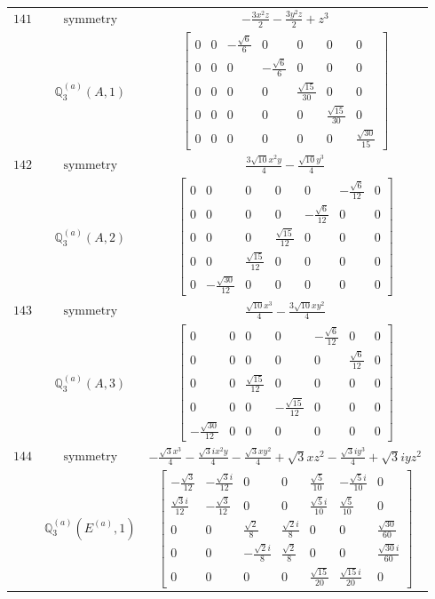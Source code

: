 \documentclass[fleqn,8pt,landscape]{jsarticle}
\begin{document}
\begin{longtable}{ccc}
$ 141 $ & $ \text{symmetry} $ & $ - \frac{3 x^{2} z}{2} - \frac{3 y^{2} z}{2} + z^{3} $ \\
$  $ & $ \mathbb{Q}_{3}^{(a)}(A,1) $ & $ \begin{bmatrix} 0 & 0 & - \frac{\sqrt{6}}{6} & 0 & 0 & 0 & 0 \\ 0 & 0 & 0 & - \frac{\sqrt{6}}{6} & 0 & 0 & 0 \\ 0 & 0 & 0 & 0 & \frac{\sqrt{15}}{30} & 0 & 0 \\ 0 & 0 & 0 & 0 & 0 & \frac{\sqrt{15}}{30} & 0 \\ 0 & 0 & 0 & 0 & 0 & 0 & \frac{\sqrt{30}}{15} \end{bmatrix} $ \\ \hline
$ 142 $ & $ \text{symmetry} $ & $ \frac{3 \sqrt{10} x^{2} y}{4} - \frac{\sqrt{10} y^{3}}{4} $ \\
$  $ & $ \mathbb{Q}_{3}^{(a)}(A,2) $ & $ \begin{bmatrix} 0 & 0 & 0 & 0 & 0 & - \frac{\sqrt{6}}{12} & 0 \\ 0 & 0 & 0 & 0 & - \frac{\sqrt{6}}{12} & 0 & 0 \\ 0 & 0 & 0 & \frac{\sqrt{15}}{12} & 0 & 0 & 0 \\ 0 & 0 & \frac{\sqrt{15}}{12} & 0 & 0 & 0 & 0 \\ 0 & - \frac{\sqrt{30}}{12} & 0 & 0 & 0 & 0 & 0 \end{bmatrix} $ \\ \hline
$ 143 $ & $ \text{symmetry} $ & $ \frac{\sqrt{10} x^{3}}{4} - \frac{3 \sqrt{10} x y^{2}}{4} $ \\
$  $ & $ \mathbb{Q}_{3}^{(a)}(A,3) $ & $ \begin{bmatrix} 0 & 0 & 0 & 0 & - \frac{\sqrt{6}}{12} & 0 & 0 \\ 0 & 0 & 0 & 0 & 0 & \frac{\sqrt{6}}{12} & 0 \\ 0 & 0 & \frac{\sqrt{15}}{12} & 0 & 0 & 0 & 0 \\ 0 & 0 & 0 & - \frac{\sqrt{15}}{12} & 0 & 0 & 0 \\ - \frac{\sqrt{30}}{12} & 0 & 0 & 0 & 0 & 0 & 0 \end{bmatrix} $ \\ \hline
$ 144 $ & $ \text{symmetry} $ & $ - \frac{\sqrt{3} x^{3}}{4} - \frac{\sqrt{3} i x^{2} y}{4} - \frac{\sqrt{3} x y^{2}}{4} + \sqrt{3} x z^{2} - \frac{\sqrt{3} i y^{3}}{4} + \sqrt{3} i y z^{2} $ \\
$  $ & $ \mathbb{Q}_{3}^{(a)}(E^{(a)},1) $ & $ \begin{bmatrix} - \frac{\sqrt{3}}{12} & - \frac{\sqrt{3} i}{12} & 0 & 0 & \frac{\sqrt{5}}{10} & - \frac{\sqrt{5} i}{10} & 0 \\ \frac{\sqrt{3} i}{12} & - \frac{\sqrt{3}}{12} & 0 & 0 & \frac{\sqrt{5} i}{10} & \frac{\sqrt{5}}{10} & 0 \\ 0 & 0 & \frac{\sqrt{2}}{8} & \frac{\sqrt{2} i}{8} & 0 & 0 & \frac{\sqrt{30}}{60} \\ 0 & 0 & - \frac{\sqrt{2} i}{8} & \frac{\sqrt{2}}{8} & 0 & 0 & \frac{\sqrt{30} i}{60} \\ 0 & 0 & 0 & 0 & \frac{\sqrt{15}}{20} & \frac{\sqrt{15} i}{20} & 0 \end{bmatrix} $ \\ \hline

\end{longtable}
\end{document}
